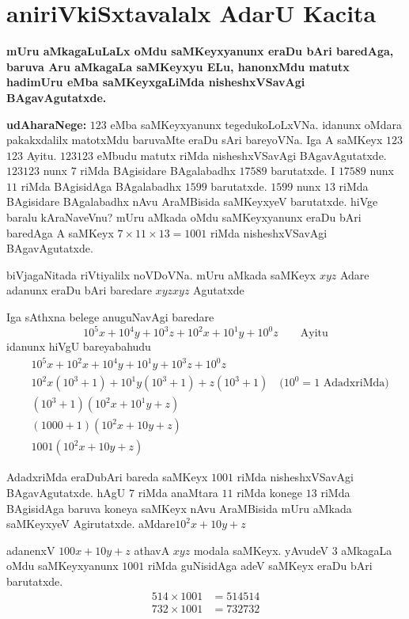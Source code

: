 \chapter{aniriVkiSxtavalalx AdarU Kacita}
\vskip -20pt

{\bf mUru aMkagaLuLaLx oMdu saMKeyxyanunx eraDu bAri baredAga, baruva Aru aMkagaLa saMKeyxyu ELu, hanonxMdu matutx hadimUru eMba saMKeyxgaLiMda nisheshxVSavAgi BAgavAgutatxde.}

\textbf{udAharaNege:} $123$ eMba saMKeyxyanunx tegedukoLoLxVNa. idanunx oMdara pakakxdalilx matotxMdu baruvaMte eraDu sAri bareyoVNa. Iga A saMKeyx $123$ $123$ Ayitu. $123123$ eMbudu {} matutx {} riMda nisheshxVSavAgi BAgavAgutatxde. $123123$ nunx $7$ riMda BAgisidare BAgalabadhx $17589$ barutatxde. I $17589$ nunx $11$ riMda BAgisidAga BAgalabadhx $1599$ barutatxde. $1599$ nunx $13$ riMda BAgisidare BAgalabadhx nAvu AraMBisida saMKeyxyeV barutatxde. hiVge baralu kAraNaveVnu? mUru aMkada oMdu saMKeyxyanunx eraDu bAri baredAga A saMKeyx $7\times 11 \times 13 = 1001$ riMda nisheshxVSavAgi BAgavAgutatxde.

biVjagaNitada riVtiyalilx noVDoVNa. mUru aMkada saMKeyx $xyz$ Adare adanunx eraDu bAri baredare $xyzxyz$ Agutatxde

Iga sAthxna belege anuguNavAgi baredare
$$
10^5x+10^4y+10^3z+10^2x+10^1y+10^{0}z \qquad\text{Ayitu}
$$
idanunx hiVgU bareyabahudu
\begin{align*}
&10^{5}x+10^{2}x+10^{4}y+10^1y+10^{3}z+10^{0}z\\
&10^{2}x\left(10^3+1\right) + 10^{1}y\left(10^3+1\right) + z\left(10^3 + 1\right) \quad\text{($10^0 = 1$ AdadxriMda)}\\
&\left(10^3+1\right)\left(10^{2}x + 10^1{y} + z\right)\\
&(1000+1)\left(10^{2}x+10y+z\right)\\
&1001\left(10^{2}x +10y +z\right)
\end{align*}

AdadxriMda eraDubAri bareda saMKeyx $1001$ riMda nisheshxVSavAgi BAgavAgutatxde. hAgU $7$ riMda anaMtara $11$ riMda konege $13$ riMda BAgisidAga baruva koneya saMKeyx nAvu AraMBisida mUru aMkada saMKeyxyeV Agirutatxde. aMdare\break $10^{2}x+10y+z$

adanenxV $100x+10y+z$ athavA $xyz$ modala saMKeyx. yAvudeV $3$ aMkagaLa oMdu saMKeyxyanunx $1001$ riMda guNisidAga adeV saMKeyx eraDu bAri barutatxde.
\begin{align*}
514\times 1001 &= 514514\\
732\times 1001 &= 732732
\end{align*}

